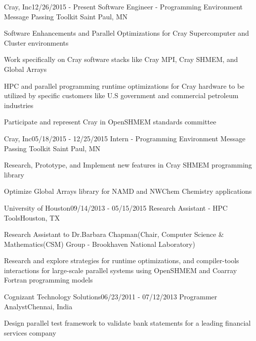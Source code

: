 \begin{rSubsection}{Cray, Inc}{12/26/2015 - Present}
                   {Software Engineer - Programming Environment Message Passing Toolkit}
                   {Saint Paul, MN}
\item Software Enhancements and Parallel Optimizations for Cray Supercomputer and
      Cluster environments
\item Work specifically on Cray software stacks like Cray MPI, Cray SHMEM, and
      Global Arrays
\item HPC and parallel programming runtime optimizations for Cray hardware to be
      utilized by specific customers like U.S government and commercial petroleum
      industries
\item Participate and represent Cray in OpenSHMEM standards committee
\end{rSubsection}

\begin{rSubsection}{Cray, Inc}{05/18/2015 - 12/25/2015}
                   {Intern - Programming Environment Message Passing Toolkit}
                   {Saint Paul, MN}
\item Research, Prototype, and Implement new features in Cray SHMEM programming
      library
\item Optimize Global Arrays library for NAMD and NWChem Chemistry
      applications
\end{rSubsection}

\begin{rSubsection}{University of Houston}{09/14/2013 - 05/15/2015}
                   {Research Assistant - HPC Tools}{Houston, TX}
\item Research Assistant to Dr.Barbara Chapman(Chair, Computer Science
      \& Mathematics(CSM) Group - Brookhaven National Laboratory)
\item Research and explore strategies for runtime optimizations, and
      compiler-tools interactions for large-scale parallel systems using
      OpenSHMEM and Coarray Fortran programming models
\end{rSubsection}

\begin{rSubsection}{Cognizant Technology Solutions}{06/23/2011 - 07/12/2013}
                   {Programmer Analyst}{Chennai, India}
\item Design parallel test framework to validate bank statements for a leading
      financial services company
\end{rSubsection}